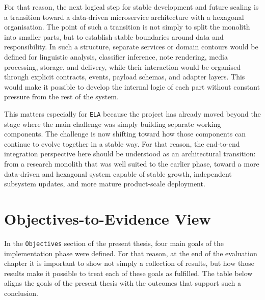 \documentclass[12pt,a4paper,oneside]{report}
\begin{document}
For that reason, the next logical step for stable development and future scaling is a transition toward a data-driven microservice architecture with a hexagonal organisation. The point of such a transition is not simply to split the monolith into smaller parts, but to establish stable boundaries around data and responsibility. In such a structure, separate services or domain contours would be defined for linguistic analysis, classifier inference, note rendering, media processing, storage, and delivery, while their interaction would be organised through explicit contracts, events, payload schemas, and adapter layers. This would make it possible to develop the internal logic of each part without constant pressure from the rest of the system.

This matters especially for \texttt{ELA} because the project has already moved beyond the stage where the main challenge was simply building separate working components. The challenge is now shifting toward how those components can continue to evolve together in a stable way. For that reason, the end-to-end integration perspective here should be understood as an architectural transition: from a research monolith that was well suited to the earlier phase, toward a more data-driven and hexagonal system capable of stable growth, independent subsystem updates, and more mature product-scale deployment.

\section{Objectives-to-Evidence View}
In the \texttt{Objectives} section of the present thesis, four main goals of the implementation phase were defined. For that reason, at the end of the evaluation chapter it is important to show not simply a collection of results, but how those results make it possible to treat each of these goals as fulfilled. The table below aligns the goals of the present thesis with the outcomes that support such a conclusion.
\end{document}
